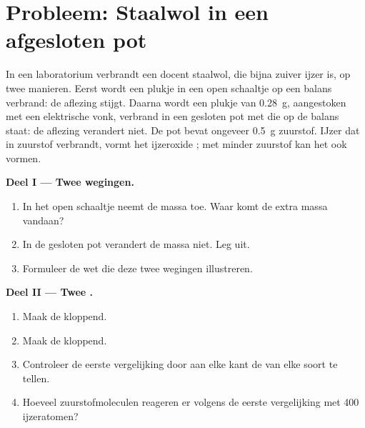 \section{Probleem: Staalwol in een afgesloten pot}

\begin{problem}
\label{pb:g8:balanced-equations:1}
In een laboratorium verbrandt een docent staalwol, die bijna zuiver ijzer
is, op twee manieren. Eerst wordt een plukje in een open schaaltje op
een balans verbrand: de aflezing stijgt. Daarna wordt een plukje van
\qty{0.28}{g}, aangestoken met een elektrische vonk, verbrand in een
gesloten pot met  die op de balans staat: de aflezing verandert
niet. De pot bevat ongeveer \qty{0.5}{g} zuurstof. IJzer dat in zuurstof
verbrandt, vormt het ijzeroxide ; met minder zuurstof kan het
ook  vormen.

\medskip
\noindent\textbf{Deel I --- Twee wegingen.}
\begin{enumerate}
  \item In het open schaaltje neemt de massa toe. Waar komt de extra
        massa vandaan?
  \item In de gesloten pot verandert de massa niet. Leg uit.
  \item Formuleer de wet die deze twee wegingen illustreren.
\end{enumerate}

\medskip
\noindent\textbf{Deel II --- Twee .}
\begin{enumerate}[resume]
  \item Maak de   kloppend. %
  \item Maak de   kloppend. %
  \item Controleer de eerste vergelijking door aan elke kant de 
        van elke soort te tellen.
  \item Hoeveel zuurstofmoleculen reageren er volgens de eerste
        vergelijking met 400 ijzeratomen?
\end{enumerate}


\end{problem}
